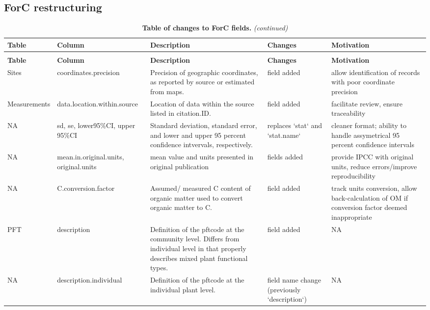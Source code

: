 \documentclass[, manuscript]{copernicus}
\begin{document}
\subsection{ForC restructuring}

\begin{longtabu} to 
\caption{\label{tab:table_ForCchanges}\textbf{Table of changes to ForC fields.}}\\
\hline
\textbf{Table} & \textbf{Column} & \textbf{Description} & \textbf{Changes} & \textbf{Motivation}\\
\hline
\endfirsthead
\caption[]{\textbf{Table of changes to ForC fields.} \textit{(continued)}}\\
\hline
\textbf{Table} & \textbf{Column} & \textbf{Description} & \textbf{Changes} & \textbf{Motivation}\\
\hline
\endhead
Sites & coordinates.precision & Precision of geographic coordinates, as reported by source or estimated from maps. & field added & allow identification of records with poor coordinate precision\\
\hline
Measurements & data.location.within.source & Location of data within the source listed in citation.ID. & field added & facilitate review, ensure traceability\\
\hline
NA & sd, se, lower95\%CI, upper 95\%CI & Standard deviation, standard error, and lower and upper 95 percent confidence intvervals, respectively. & replaces `stat` and `stat.name` & cleaner format; ability to handle assymetrical 95 percent confidence intervals\\
\hline
NA & mean.in.original.units, original.units & mean value and units presented in original publication & fields added & provide IPCC with original units, reduce errors/improve reproducibility\\
\hline
NA & C.conversion.factor & Assumed/ measured C content of organic matter used to convert organic matter to C. & field added & track units conversion, allow back-calculation of OM if conversion factor deemed inappropriate\\
\hline
PFT & description & Definition of the pftcode at the community level. Differs from individual level in that properly describes mixed plant functional types. & field added & NA\\
\hline
NA & description.individual & Definition of the pftcode at the individual plant level. & field name change (previously `description`) & NA\\

\end{longtabu}
\end{document}

